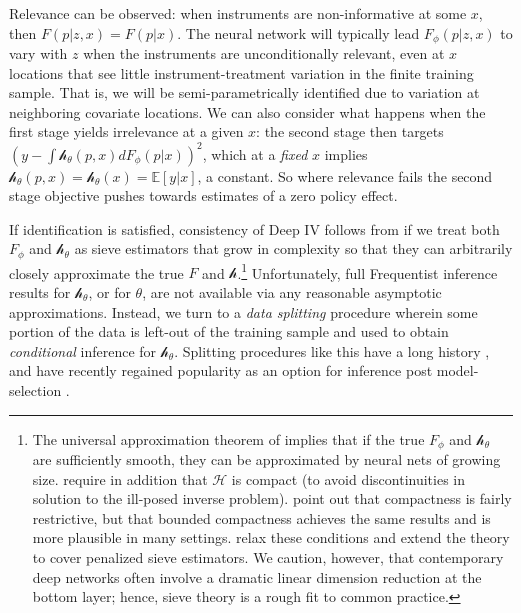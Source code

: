 \documentclass[12pt]{article}
\newcommand{\mc}[1]{\mathcal{#1}}
\newcommand{\ds}[1]{\mathds{#1}}
\newcommand{\cf}{\ensuremath{\mathscr{h}}}
\begin{document}
Relevance can be observed: when instruments are non-informative at some $x$, then $F(p|z,x) = F(p|x)$. The  neural network will typically lead $F_\phi(p|z,x)$ to vary with $z$ when the instruments are unconditionally relevant, even at $x$ locations that see little instrument-treatment variation in the finite training sample.  That is, we will be semi-parametrically identified due to variation at neighboring covariate locations. We can also consider what happens when the first stage yields irrelevance at a given $x$: the second stage then targets $\left(y - \int \cf_\theta(p,x) dF_\phi(p|x)\right)^2$,  which at a {\it fixed} $x$ implies $\cf_\theta(p,x) = \cf_\theta(x) = \ds{E}[y|x]$, a constant.  
So where relevance fails the second stage objective pushes towards estimates of a zero policy effect.

If identification is satisfied, consistency of Deep IV follows from \citet[Lemma A1 and Theorem 4.1]{newey2003instrumental} if we treat both $F_\phi$ and $\cf_\theta$ as sieve estimators that grow in complexity so that they can arbitrarily closely approximate the true $F$ and $\cf$.\footnote{The universal approximation theorem of \cite{hornik1991approximation} implies that if the true $F_\phi$ and $\cf_\theta$ are sufficiently smooth, they can be approximated by neural nets of growing size. \cite{newey2003instrumental} require in addition that $\mc{H}$ is compact (to avoid discontinuities in solution to the ill-posed inverse problem). \cite{BCK2007} point out that compactness is fairly restrictive, but that bounded compactness achieves the same results and is more plausible in many settings.  \cite{chenpouzo12} relax these conditions and extend the theory to cover penalized sieve estimators.  We caution, however, that contemporary deep networks often involve a dramatic linear dimension reduction at the bottom layer; hence, sieve theory is a rough fit to common practice. }
Unfortunately, full Frequentist inference results for $\cf_\theta$, or for $\theta$, are not available via any reasonable asymptotic approximations.  Instead, we turn to a {\it data splitting} procedure wherein some portion of the data is left-out of the training sample and used to obtain {\it conditional} inference for $\cf_\theta$.  Splitting procedures like this have a long history \citep{cox1975note}, and have recently regained popularity as an option for  inference post model-selection \citep[e.g.,][]{fithian2015optimal,wager2015inference}.
\end{document}
